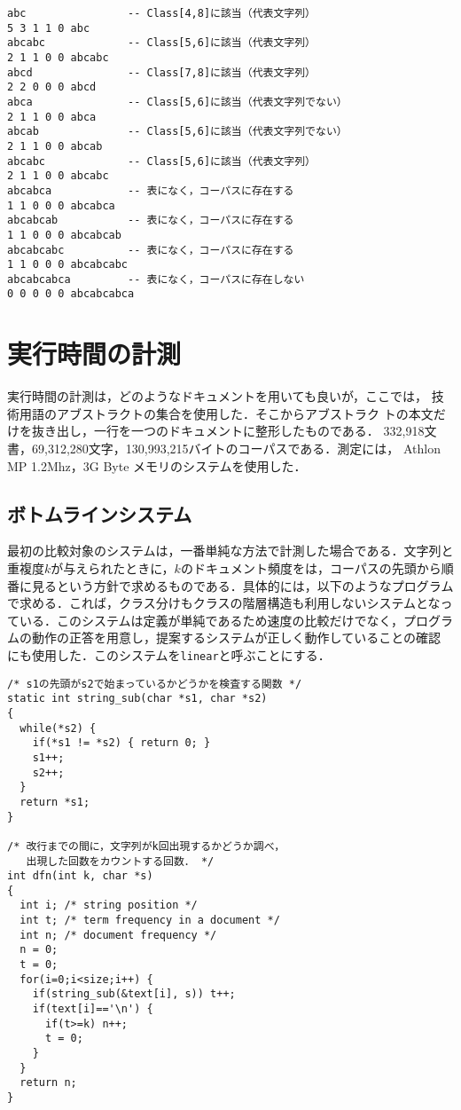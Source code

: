 \begin{verbatim}
abc                -- Class[4,8]に該当（代表文字列）
5 3 1 1 0 abc
abcabc             -- Class[5,6]に該当（代表文字列）
2 1 1 0 0 abcabc
abcd               -- Class[7,8]に該当（代表文字列）
2 2 0 0 0 abcd
abca               -- Class[5,6]に該当（代表文字列でない）
2 1 1 0 0 abca
abcab              -- Class[5,6]に該当（代表文字列でない）
2 1 1 0 0 abcab
abcabc             -- Class[5,6]に該当（代表文字列）
2 1 1 0 0 abcabc
abcabca            -- 表になく，コーパスに存在する
1 1 0 0 0 abcabca
abcabcab           -- 表になく，コーパスに存在する
1 1 0 0 0 abcabcab
abcabcabc          -- 表になく，コーパスに存在する
1 1 0 0 0 abcabcabc
abcabcabca         -- 表になく，コーパスに存在しない
0 0 0 0 0 abcabcabca
\end{verbatim}


\section{実行時間の計測}

実行時間の計測は，どのようなドキュメントを用いても良いが，ここでは，
技術用語のアブストラクトの集合を使用した．そこからアブストラク
トの本文だけを抜き出し，一行を一つのドキュメントに整形したものである．
332,918文書，69,312,280文字，130,993,215バイトのコーパスである．測定には，
Athlon MP 1.2Mhz，3G Byte メモリのシステムを使用した．


\subsection{ボトムラインシステム}

最初の比較対象のシステムは，一番単純な方法で計測した場合である．文字列と
重複度$k$が与えられたときに，$k$のドキュメント頻度をは，コーパスの先頭から順
番に見るという方針で求めるものである．具体的には，以下のようなプログラム
で求める．これば，クラス分けもクラスの階層構造も利用しないシステムとなっ
ている．このシステムは定義が単純であるため速度の比較だけでなく，プログラ
ムの動作の正答を用意し，提案するシステムが正しく動作していることの確認
にも使用した．このシステムを{\tt linear}と呼ぶことにする．


\begin{verbatim}
/* s1の先頭がs2で始まっているかどうかを検査する関数 */
static int string_sub(char *s1, char *s2)
{ 
  while(*s2) {
    if(*s1 != *s2) { return 0; }
    s1++;
    s2++;
  }
  return *s1;
}

/* 改行までの間に，文字列がk回出現するかどうか調べ，
   出現した回数をカウントする回数． */
int dfn(int k, char *s)
{ 
  int i; /* string position */
  int t; /* term frequency in a document */
  int n; /* document frequency */
  n = 0;
  t = 0;
  for(i=0;i<size;i++) {
    if(string_sub(&text[i], s)) t++;
    if(text[i]=='\n') {
      if(t>=k) n++;
      t = 0;
    }
  }
  return n;
}

\end{verbatim}

